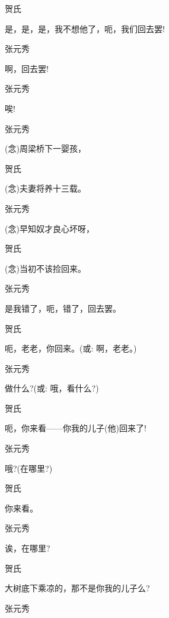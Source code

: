 贺氏\hspace{30pt}~

是，是，是，我不想他了，呃，我们回去罢!

张元秀\hspace{20pt}~

啊，回去罢!

张元秀\hspace{20pt}~

唉!

张元秀\hspace{20pt}~

({\akai 念})周梁桥下一婴孩，

贺氏\hspace{30pt}~

({\akai 念})夫妻将养十三载。

张元秀\hspace{20pt}~

({\akai 念})早知奴才良心坏呀，

贺氏\hspace{30pt}~

({\akai 念})当初不该捡回来。

张元秀\hspace{20pt}~

是我错了，呃，错了，回去罢。

贺氏\hspace{30pt}~

呃，老老，你回来。({\akai 或}: 啊，老老。)

张元秀\hspace{20pt}~

做什么?({\akai 或}: 哦，看什么?)

贺氏\hspace{30pt}~

呃，你来看------你我的儿子(他)回来了!

张元秀\hspace{20pt}~

哦?(在哪里?)

贺氏\hspace{30pt}~

你来看。

张元秀\hspace{20pt}~

诶，在哪里?

贺氏\hspace{30pt}~

大树底下乘凉的，那不是你我的儿子么?

张元秀\hspace{20pt}~

